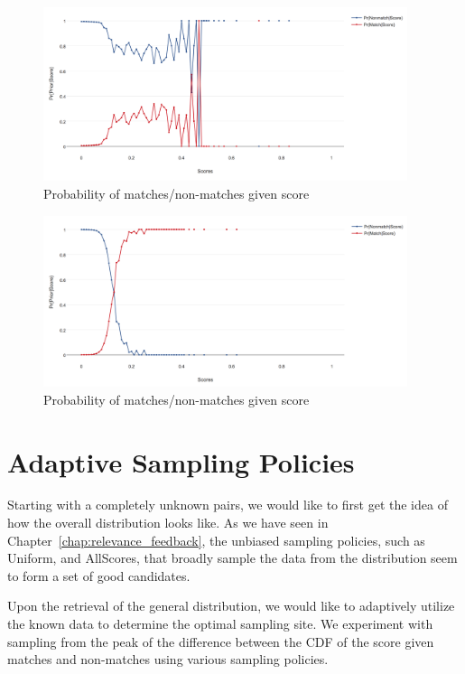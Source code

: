 \begin{figure}[ht]
  \centering
  \includegraphics[width=0.95\textwidth]{dataset/grand/pms}
  \caption{Probability of matches/non-matches given score}
  \label{fig:grand_pms} %
\end{figure}

\begin{figure}[ht]
  \centering
  \includegraphics[width=0.95\textwidth]{dataset/otago/pms}
  \caption{Probability of matches/non-matches given score}
  \label{fig:otago_pms} %
\end{figure}

\section{Adaptive Sampling Policies} %
\label{sec:sampling_policies}

Starting with a completely unknown pairs, we would like to first get the idea
of how the overall distribution looks like. As we have seen in
Chapter~\ref{chap:relevance_feedback}, the unbiased sampling policies, such as
Uniform, and AllScores, that broadly sample the data from the distribution seem
to form a set of good candidates.

Upon the retrieval of the general distribution, we would like to adaptively
utilize the known data to determine the optimal sampling site. We experiment
with sampling from the peak of the difference between the CDF of the score
given matches and non-matches using various sampling policies.

